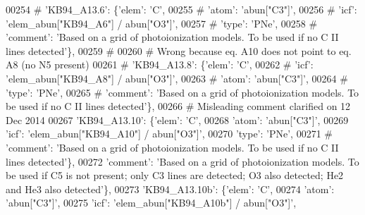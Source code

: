 \begin{DoxyCode}
00254 \textcolor{comment}{#                         'KB94\_A13.6': \{'elem': 'C',}
00255 \textcolor{comment}{#                                      'atom': 'abun["C3"]',}
00256 \textcolor{comment}{#                                      'icf': 'elem\_abun["KB94\_A6"] / abun["O3"]',}
00257 \textcolor{comment}{#                                      'type': 'PNe',}
00258 \textcolor{comment}{#                                      'comment': 'Based on a grid of photoionization models. To be used if
       no C II lines detected'\},}
00259 \textcolor{comment}{#}
00260 \textcolor{comment}{# Wrong because eq. A10 does not point to eq. A8 (no N5 present)}
00261 \textcolor{comment}{#                         'KB94\_A13.8': \{'elem': 'C',}
00262 \textcolor{comment}{#                                      'icf': 'elem\_abun["KB94\_A8"] / abun["O3"]',}
00263 \textcolor{comment}{#                                      'atom': 'abun["C3"]',}
00264 \textcolor{comment}{#                                      'type': 'PNe',}
00265 \textcolor{comment}{#                                      'comment': 'Based on a grid of photoionization models. To be used if
       no C II lines detected'\},}
00266 \textcolor{comment}{# Misleading comment clarified on 12 Dec 2014 }
00267                          \textcolor{stringliteral}{'KB94\_A13.10'}: \{\textcolor{stringliteral}{'elem'}: \textcolor{stringliteral}{'C'},
00268                                       \textcolor{stringliteral}{'atom'}: \textcolor{stringliteral}{'abun["C3"]'},
00269                                       \textcolor{stringliteral}{'icf'}: \textcolor{stringliteral}{'elem\_abun["KB94\_A10"] / abun["O3"]'},
00270                                       \textcolor{stringliteral}{'type'}: \textcolor{stringliteral}{'PNe'},
00271 \textcolor{comment}{#                                     'comment': 'Based on a grid of photoionization models. To be used if
       no C II lines detected'\},}
00272                                       \textcolor{stringliteral}{'comment'}: \textcolor{stringliteral}{'Based on a grid of photoionization models. To be used if
       C5 is not present; only C3 lines are detected; O3 also detected; He2 and He3 also detected'}\},
00273                          \textcolor{stringliteral}{'KB94\_A13.10b'}: \{\textcolor{stringliteral}{'elem'}: \textcolor{stringliteral}{'C'},
00274                                       \textcolor{stringliteral}{'atom'}: \textcolor{stringliteral}{'abun["C3"]'},
00275                                       \textcolor{stringliteral}{'icf'}: \textcolor{stringliteral}{'elem\_abun["KB94\_A10b"] / abun["O3"]'},

\end{DoxyCode}
